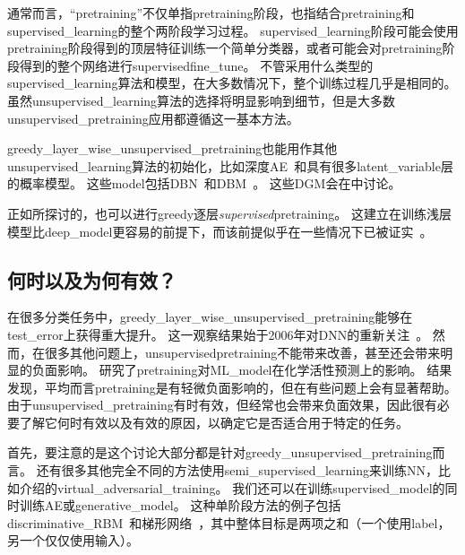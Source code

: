 通常而言，``\gls{pretraining}''不仅单指\gls{pretraining}阶段，也指结合\gls{pretraining}和\gls{supervised_learning}的整个两阶段学习过程。
\gls{supervised_learning}阶段可能会使用\gls{pretraining}阶段得到的顶层特征训练一个简单分类器，或者可能会对\gls{pretraining}阶段得到的整个网络进行\gls{supervised}\gls{fine_tune}。
不管采用什么类型的\gls{supervised_learning}算法和模型，在大多数情况下，整个训练过程几乎是相同的。
虽然\gls{unsupervised_learning}算法的选择将明显影响到细节，但是大多数\gls{unsupervised_pretraining}应用都遵循这一基本方法。


\gls{greedy_layer_wise_unsupervised_pretraining}也能用作其他\gls{unsupervised_learning}算法的初始化，比如深度\gls{AE}~\citep{Hinton-Science2006}和具有很多\gls{latent_variable}层的概率模型。
这些\gls{model}包括\gls{DBN}~\citep{Hinton06-small}和\gls{DBM}~\citep{Salakhutdinov+Hinton-2009-small}。
这些\gls{DGM}会在中讨论。


正如所探讨的，也可以进行\gls{greedy}逐层\emph{\gls{supervised}}\gls{pretraining}。
这建立在训练浅层模型比\gls{deep_model}更容易的前提下，而该前提似乎在一些情况下已被证实~\citep{Erhan+al-2010-small}。

\subsection{何时以及为何有效？}
\label{sec:when_and_why_does_unsupervised_pretraining_work}

在很多分类任务中，\gls{greedy_layer_wise_unsupervised_pretraining}能够在\gls{test_error}上获得重大提升。
这一观察结果始于2006年对\gls{DNN}的重新关注~\citep{Hinton06-small,Bengio-nips-2006,ranzato-07-small}。
然而，在很多其他问题上，\gls{unsupervised}\gls{pretraining}不能带来改善，甚至还会带来明显的负面影响。
\cite{Ma-et-al-2015}研究了\gls{pretraining}对\gls{ML_model}在化学活性预测上的影响。
结果发现，平均而言\gls{pretraining}是有轻微负面影响的，但在有些问题上会有显著帮助。
由于\gls{unsupervised_pretraining}有时有效，但经常也会带来负面效果，因此很有必要了解它何时有效以及有效的原因，以确定它是否适合用于特定的任务。

首先，要注意的是这个讨论大部分都是针对\gls{greedy_unsupervised_pretraining}而言。
还有很多其他完全不同的方法使用\gls{semi_supervised_learning}来训练\gls{NN}，比如介绍的\gls{virtual_adversarial_training}。
我们还可以在训练\gls{supervised_model}的同时训练\gls{AE}或\gls{generative_model}。
这种单阶段方法的例子包括\gls{discriminative_RBM}~\citep{Larochelle+Bengio-2008}和梯形网络~\citep{Rasmus-et-al-arxiv2015}，其中整体目标是两项之和（一个使用\gls{label}，另一个仅仅使用输入）。


